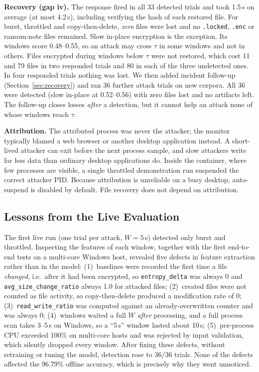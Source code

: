 \documentclass[conference]{IEEEtran}
\begin{document}
\textbf{Recovery (gap iv).} The response fired in all 33 detected trials and took 1.5\,s on average (at most 4.2\,s), including verifying the hash of each restored file. For burst, throttled and copy-then-delete, \emph{zero} files were lost and no \texttt{.locked}, \texttt{.enc} or ransom-note files remained. Slow in-place encryption is the exception. Its windows score 0.48--0.55, so an attack may cross $\tau$ in some windows and not in others. Files encrypted during windows below $\tau$ were not restored, which cost 11 and 79 files in two responded trials and 80 in each of the three undetected ones. In four responded trials nothing was lost. We then added incident follow-up (Section~\ref{sec:recovery}) and ran 36 further attack trials on new corpora. All 36 were detected (slow in-place at 0.52--0.56) with zero files lost and no artifacts left. The follow-up closes losses \emph{after} a detection, but it cannot help an attack none of whose windows reach $\tau$.

\textbf{Attribution.} The attributed process was never the attacker; the monitor typically blamed a web browser or another desktop application instead. A short-lived attacker can exit before the next process sample, and slow attackers write far less data than ordinary desktop applications do. Inside the container, where few processes are visible, a single throttled demonstration run suspended the correct attacker PID. Because attribution is unreliable on a busy desktop, auto-suspend is disabled by default. File recovery does not depend on attribution.

\subsection{Lessons from the Live Evaluation}\label{sec:lessons}
The first live run (one trial per attack, $W = 5$\,s) detected only burst and throttled. Inspecting the features of each window, together with the first end-to-end tests on a multi-core Windows host, revealed five defects in feature extraction rather than in the model:
(1)~baselines were recorded the first time a file \emph{changed}, i.e.\ after it had been encrypted, so \texttt{entropy\_delta} was always 0 and \texttt{avg\_size\_change\_ratio} always 1.0 for attacked files;
(2)~created files were not counted as file activity, so copy-then-delete produced a modification rate of 0;
(3)~\texttt{read\_write\_ratio} was computed against an already-overwritten counter and was always 0;
(4)~windows waited a full $W$ \emph{after} processing, and a full process scan takes 3--5\,s on Windows, so a ``5\,s'' window lasted about 10\,s;
(5)~per-process CPU exceeded 100\% on multi-core hosts and was rejected by input validation, which silently dropped every window.
After fixing these defects, without retraining or tuning the model, detection rose to 36/36 trials. None of the defects affected the 96.79\% offline accuracy, which is precisely why they went unnoticed.
\end{document}
